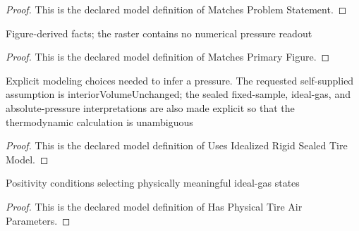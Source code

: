 \begin{proof}
  This is the declared model definition of Matches Problem Statement.
\end{proof}
\begin{definition}
  \label{def:physics:phyx-mini-0441:phyxminiproblems-problemphyxmini0441-matchesprimaryfigure}
  Figure-derived facts; the raster contains no numerical pressure readout
\end{definition}
\begin{proof}
  This is the declared model definition of Matches Primary Figure.
\end{proof}
\begin{definition}
  \label{def:physics:phyx-mini-0441:phyxminiproblems-problemphyxmini0441-usesidealizedrigidsealedtiremodel}
  Explicit modeling choices needed to infer a pressure. The requested self-supplied assumption is interiorVolumeUnchanged; the sealed fixed-sample, ideal-gas, and absolute-pressure interpretations are also made explicit so that the thermodynamic calculation is unambiguous
\end{definition}
\begin{proof}
  This is the declared model definition of Uses Idealized Rigid Sealed Tire Model.
\end{proof}
\begin{definition}
  \label{def:physics:phyx-mini-0441:phyxminiproblems-problemphyxmini0441-hasphysicaltireairparameters}
  Positivity conditions selecting physically meaningful ideal-gas states
\end{definition}
\begin{proof}
  This is the declared model definition of Has Physical Tire Air Parameters.
\end{proof}

